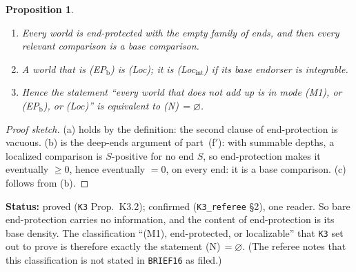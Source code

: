 \documentclass[11pt]{article}
\newtheorem{proposition}[theorem]{Proposition}
\theoremstyle{definition}
\theoremstyle{remark}
\newcommand{\src}[1]{\texttt{#1}}
\newcommand{\status}[1]{\par\smallskip\noindent\textbf{Status:} #1\par\smallskip}
\begin{document}
\begin{proposition}\label{prop:K32}
\begin{enumerate}[leftmargin=*,label=(\alph*)]
\item Every world is end-protected with the empty family of ends, and then every relevant comparison is a base comparison.
\item A world that is (EP$_{\mathrm b}$) is (Loc); it is (Loc$_{\mathrm{int}}$) if its base endorser is integrable.
\item Hence the statement ``every world that does not add up is in mode (M1), or (EP$_{\mathrm b}$), or (Loc)'' is equivalent to (N)$\,=\varnothing$.
\end{enumerate}
\end{proposition}
\begin{proof}[Proof sketch]
(a) holds by the definition: the second clause of end-protection is vacuous. (b) is the deep-ends argument of part~(f$'$): with summable depths, a localized comparison is $S$-positive for no end $S$, so end-protection makes it eventually $\ge0$, hence eventually $=0$, on every end: it is a base comparison. (c) follows from (b).
\end{proof}
\status{proved (\src{K3} Prop.~K3.2); confirmed (\src{K3\_referee} \S2), one reader. So bare end-protection carries no information, and the content of end-protection is its base density. The classification ``(M1), end-protected, or localizable'' that \src{K3} set out to prove is therefore exactly the statement (N)$\,=\varnothing$. (The referee notes that this classification is not stated in \src{BRIEF16} as filed.)}
\end{document}
